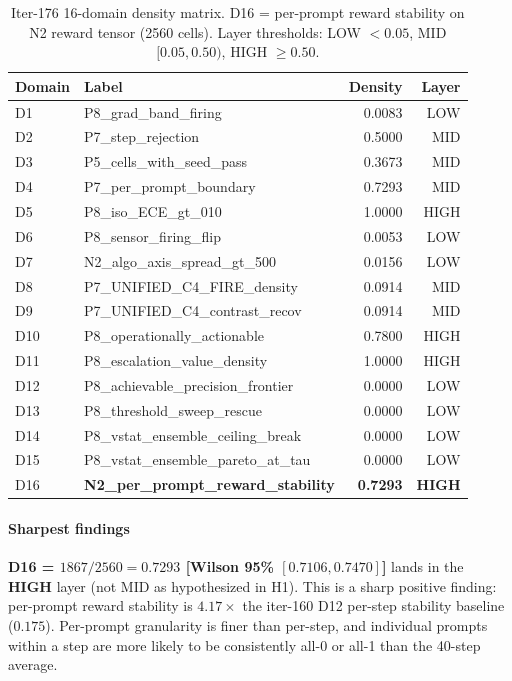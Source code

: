 \begin{table}[h]
\centering\small
\caption{Iter-176 16-domain density matrix. D16 = per-prompt reward
stability on N2 reward tensor (2560 cells). Layer thresholds:
LOW $<0.05$, MID $[0.05, 0.50)$, HIGH $\ge 0.50$.}
\label{tab:synth-iter176-d16}
\begin{tabular}{llrr}
\hline
Domain & Label & Density & Layer \\
\hline
D1  & P8\_grad\_band\_firing & 0.0083 & LOW \\
D2  & P7\_step\_rejection & 0.5000 & MID \\
D3  & P5\_cells\_with\_seed\_pass & 0.3673 & MID \\
D4  & P7\_per\_prompt\_boundary & 0.7293 & MID \\
D5  & P8\_iso\_ECE\_gt\_010 & 1.0000 & HIGH \\
D6  & P8\_sensor\_firing\_flip & 0.0053 & LOW \\
D7  & N2\_algo\_axis\_spread\_gt\_500 & 0.0156 & LOW \\
D8  & P7\_UNIFIED\_C4\_FIRE\_density & 0.0914 & MID \\
D9  & P7\_UNIFIED\_C4\_contrast\_recov & 0.0914 & MID \\
D10 & P8\_operationally\_actionable & 0.7800 & HIGH \\
D11 & P8\_escalation\_value\_density & 1.0000 & HIGH \\
D12 & P8\_achievable\_precision\_frontier & 0.0000 & LOW \\
D13 & P8\_threshold\_sweep\_rescue & 0.0000 & LOW \\
D14 & P8\_vstat\_ensemble\_ceiling\_break & 0.0000 & LOW \\
D15 & P8\_vstat\_ensemble\_pareto\_at\_tau & 0.0000 & LOW \\
D16 & \textbf{N2\_per\_prompt\_reward\_stability} & \textbf{0.7293} & \textbf{HIGH} \\
\hline
\end{tabular}
\end{table}

\paragraph{Sharpest findings}
\textbf{D16 = $1867/2560 = 0.7293$ [Wilson 95\% $[0.7106, 0.7470]$]}
lands in the \textbf{HIGH} layer (not MID as hypothesized in H1).
This is a sharp positive finding: per-prompt reward stability is
$4.17\times$ the iter-160 D12 per-step stability baseline
($0.175$). Per-prompt granularity is finer than per-step, and
individual prompts within a step are more likely to be consistently
all-0 or all-1 than the 40-step average.

